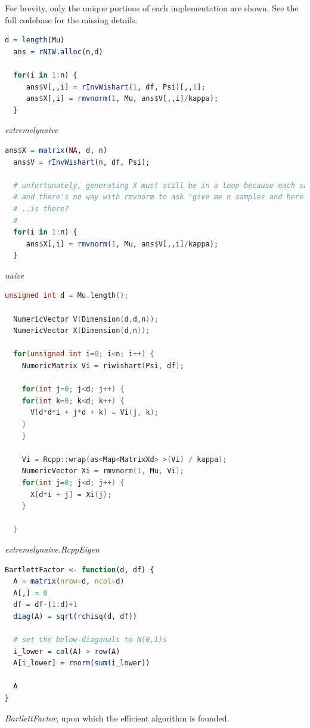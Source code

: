 \documentclass[english]{report}
\begin{document}
\newpage
\newpage



For brevity, only the unique portions of each implementation are shown. See the full codebase \cite{MNIW} for the missing details.


\begin{lstlisting}[frame=single, language=R]
  d = length(Mu)
  ans = rNIW.alloc(n,d)
  
  for(i in 1:n) {
     ans$V[,,i] = rInvWishart(1, df, Psi)[,,1];
     ans$X[,i] = rmvnorm(1, Mu, ans$V[,,i]/kappa);
  }
\end{lstlisting}
\emph{extremelynaive}


\begin{lstlisting}[frame=single, language=R]
  ans$X = matrix(NA, d, n)
  ans$V = rInvWishart(n, df, Psi);   
  
  # unfortunately, generating X must still be in a loop because each sample has a different distribution
  # and there's no way with rmvnorm to ask "give me n samples and here's the parameters for each"
  # ..is there?
  #
  for(i in 1:n) {
     ans$X[,i] = rmvnorm(1, Mu, ans$V[,,i]/kappa);
  }
\end{lstlisting}
\emph{naive}

\begin{lstlisting}[frame=single, language=C]
  unsigned int d = Mu.length();
  
  NumericVector V(Dimension(d,d,n));
  NumericVector X(Dimension(d,n));
  
  for(unsigned int i=0; i<n; i++) {
    NumericMatrix Vi = riwishart(Psi, df);

    for(int j=0; j<d; j++) {
    for(int k=0; k<d; k++) {
      V[d*d*i + j*d + k] = Vi(j, k);
    }
    }
    
    Vi = Rcpp::wrap(as<Map<MatrixXd> >(Vi) / kappa);
    NumericVector Xi = rmvnorm(1, Mu, Vi);
    for(int j=0; j<d; j++) {
      X[d*i + j] = Xi(j);
    }
    
  }
\end{lstlisting}
\emph{extremelynaive.RcppEigen}



\begin{lstlisting}[frame=single, language=R]
BartlettFactor <- function(d, df) {
  A = matrix(nrow=d, ncol=d)
  A[,] = 0
  df = df-(1:d)+1
  diag(A) = sqrt(rchisq(d, df))
    
  # set the below-diagonals to N(0,1)s
  i_lower = col(A) > row(A)
  A[i_lower] = rnorm(sum(i_lower))
  
  A
}
\end{lstlisting}
\emph{BartlettFactor}, upon which the efficient algorithm is founded.
\end{document}
